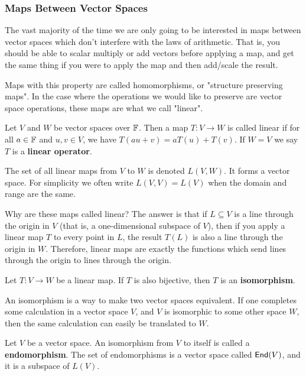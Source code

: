 \subsubsection{Maps Between Vector Spaces}

The vast majority of the time we are only going to be interested in maps between vector spaces which don't interfere with the laws of arithmetic. That is, you should be able to scalar multiply or add vectors before applying a map, and get the same thing if you were to apply the map and then add/scale the result.

Maps with this property are called homomorphisms, or "structure preserving maps". In the case where the operations we would like to preserve are vector space operations, these maps are what we call "linear".

\begin{defn}  Let $V$ and $W$ be vector spaces over $\operatorname{\mathbb{F}}$. Then a map $T : V \to W$ is called linear if for all $a \in \operatorname{\mathbb{F}}$ and $u,v \in V$, we have $T(au+v) = aT(u)+T(v)$. If $W=V$ we say $T$ is a \textbf{linear operator}.
\end{defn}
\begin{defn}
    The set of all linear maps from $V$ to $W$ is denoted $L(V,W)$. It forms a vector space. For simplicity we often write $L(V,V)=L(V)$ when the domain and range are the same.
\end{defn}

\begin{remark*}
Why are these maps called linear? The answer is that if $L \subseteq V$ is a line through the origin in $V$ (that is, a one-dimensional subspace of $V$), then if you apply a linear map $T$ to every point in $L$, the result $T(L)$ is also a line through the origin in $W$. Therefore, linear maps are exactly the functions which send lines through the origin to lines through the origin.
\end{remark*}
\begin{defn}[Isomorphism]
    Let $T : V \to W$ be a linear map. If $T$ is also bijective, then $T$ is an \textbf{isomorphism}.
\end{defn}
\begin{remark*}
    An isomorphism is a way to make two vector spaces equivalent. If one completes some calculation in a vector space $V$, and $V$ is isomorphic to some other space $W$, then the same calculation can easily be translated to $W$.
\end{remark*}
\begin{defn}
    Let $V$ be a vector space. An isomorphism from $V$ to itself is called a \textbf{endomorphism}. The set of endomorphisms is a vector space called $\operatorname{\textsf{End}}(V)$, and it is a subspace of $L(V)$.
\end{defn}

